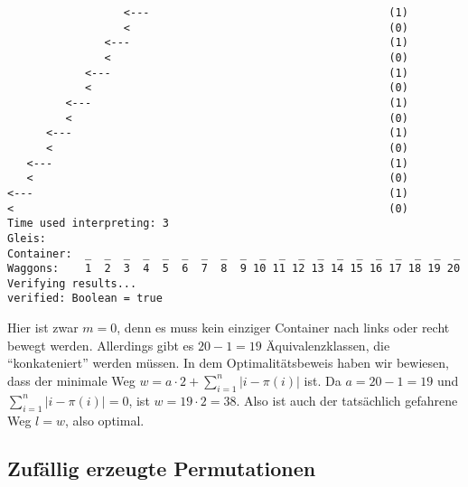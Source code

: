 \begin{lstlisting}
                  <---                                     (1)
                  <                                        (0)
               <---                                        (1)
               <                                           (0)
            <---                                           (1)
            <                                              (0)
         <---                                              (1)
         <                                                 (0)
      <---                                                 (1)
      <                                                    (0)
   <---                                                    (1)
   <                                                       (0)
<---                                                       (1)
<                                                          (0)
Time used interpreting: 3
Gleis: 
Container:  _  _  _  _  _  _  _  _  _  _  _  _  _  _  _  _  _  _  _  _
Waggons:    1  2  3  4  5  6  7  8  9 10 11 12 13 14 15 16 17 18 19 20
Verifying results...
verified: Boolean = true
\end{lstlisting}
Hier ist zwar $m = 0$, denn es muss kein einziger Container nach links oder recht bewegt werden.
Allerdings gibt es $20-1=19$ Äquivalenzklassen, die ``konkateniert'' werden müssen.
In dem Optimalitätsbeweis haben wir bewiesen, dass der minimale Weg $w = a \cdot 2 + \sum_{i = 1}^{n}{\lvert i-\pi(i)\rvert}$ ist.
Da $a=20-1=19$ und $\sum_{i = 1}^{n}{\lvert i-\pi(i)\rvert} = 0$, ist $w = 19 \cdot 2 = 38$. Also ist auch der tatsächlich gefahrene Weg $l = w$, also optimal.
\subsection{Zufällig erzeugte Permutationen}
